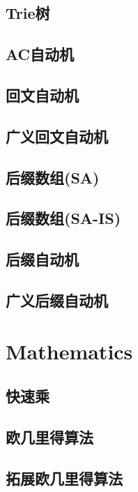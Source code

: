 \documentclass[twocolumn,a4paper]{article}  %
\begin{document}
\subsection{Trie树}

\subsection{AC自动机}

\subsection{回文自动机}

\subsection{广义回文自动机}

\subsection{后缀数组(SA)}

\subsection{后缀数组(SA-IS)}

\subsection{后缀自动机}

\subsection{广义后缀自动机}

\newpage
\section{Mathematics}
\subsection{快速乘}

\subsection{欧几里得算法}

\subsection{拓展欧几里得算法}

\end{document}
